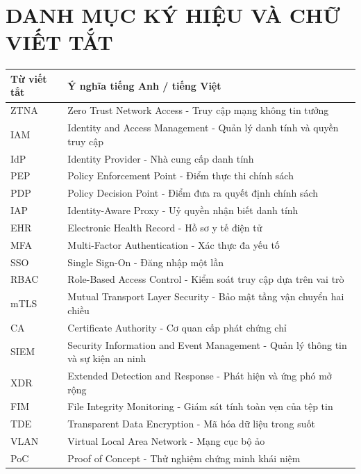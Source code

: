 \section*{DANH MỤC KÝ HIỆU VÀ CHỮ VIẾT TẮT}

\begin{longtable}{| p{3cm} | p{11cm} |}
\hline
\textbf{Từ viết tắt} & \textbf{Ý nghĩa tiếng Anh / tiếng Việt} \\ \hline
\endhead

ZTNA & Zero Trust Network Access - Truy cập mạng không tin tưởng \\ \hline
IAM & Identity and Access Management - Quản lý danh tính và quyền truy cập \\ \hline
IdP & Identity Provider - Nhà cung cấp danh tính \\ \hline
PEP & Policy Enforcement Point - Điểm thực thi chính sách \\ \hline
PDP & Policy Decision Point - Điểm đưa ra quyết định chính sách \\ \hline
IAP & Identity-Aware Proxy - Uỷ quyền nhận biết danh tính \\ \hline
EHR & Electronic Health Record - Hồ sơ y tế điện tử \\ \hline
MFA & Multi-Factor Authentication - Xác thực đa yếu tố \\ \hline
SSO & Single Sign-On - Đăng nhập một lần \\ \hline
RBAC & Role-Based Access Control - Kiểm soát truy cập dựa trên vai trò \\ \hline
mTLS & Mutual Transport Layer Security - Bảo mật tầng vận chuyển hai chiều \\ \hline
CA & Certificate Authority - Cơ quan cấp phát chứng chỉ \\ \hline
SIEM & Security Information and Event Management - Quản lý thông tin và sự kiện an ninh \\ \hline
XDR & Extended Detection and Response - Phát hiện và ứng phó mở rộng \\ \hline
FIM & File Integrity Monitoring - Giám sát tính toàn vẹn của tệp tin \\ \hline
TDE & Transparent Data Encryption - Mã hóa dữ liệu trong suốt \\ \hline
VLAN & Virtual Local Area Network - Mạng cục bộ ảo \\ \hline
PoC & Proof of Concept - Thử nghiệm chứng minh khái niệm \\ \hline
\end{longtable}

\newpage

